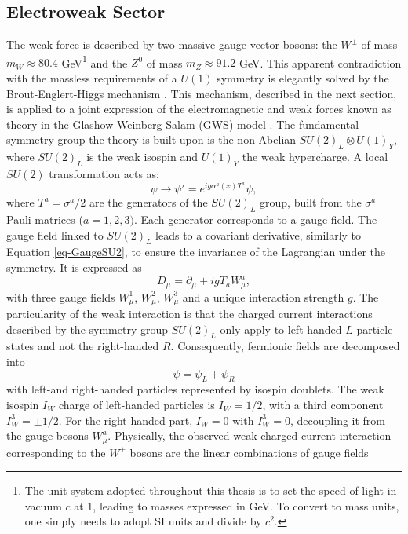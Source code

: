 \subsection{Electroweak Sector}
The weak force is described by two massive gauge vector bosons: the $W^{\pm}$ of mass $m_W \approx 80.4$ GeV\footnote{The unit system adopted throughout this thesis is to set the speed of light in vacuum $c$ at 1, leading to masses expressed in GeV. To convert to mass units, one simply needs to adopt SI units and divide by $c^2$.} and the $Z^0$ of mass $m_Z \approx 91.2$ GeV. This apparent contradiction with the massless requirements of a $U(1)$ symmetry is elegantly solved by the Brout-Englert-Higgs mechanism \cite{Englert:1964et,  PhysRevLett.13.508}. This mechanism, described in the next section, is applied to a joint expression of the electromagnetic and weak forces known as  theory in the Glashow-Weinberg-Salam (GWS) model \cite{GLASHOW1961579, PhysRevLett.19.1264, Salam:1968rm}. The fundamental symmetry group the theory is built upon is the non-Abelian $SU(2)_L \otimes U(1)_Y$, where $SU(2)_L$ is the weak isospin and $U(1)_Y$ the weak hypercharge. A local $SU(2)$ transformation acts as:
\begin{equation}\label{eq-GaugeSU2}
    \psi \rightarrow \psi' = e^{i g \alpha^a(x) T^a } \psi,
\end{equation}
where $T^a = \sigma^a / 2$ are the generators of the $SU(2)_L$ group, built from the $\sigma^a$ Pauli matrices ($a = 1, 2, 3)$. Each generator corresponds to a gauge field. The gauge field linked to $SU(2)_L$ leads to a covariant derivative, similarly to Equation \ref{eq-GaugeSU2}, to ensure the invariance of the Lagrangian under the symmetry. It is expressed as
\begin{equation}\label{eq-CovDerSU2}
   D_{\mu}  = \partial_{\mu} + igT_a W_{\mu}^a,
\end{equation}
with three gauge fields $W_{\mu}^1$, $W_{\mu}^2$, $W_{\mu}^3$ and a unique interaction strength $g$. The particularity of the weak interaction is that the charged current interactions described by the symmetry group $SU(2)_L$ only apply to left-handed $L$ particle states and not the right-handed $R$. Consequently, fermionic fields are decomposed into \[\psi = \psi_L + \psi_R\] with left-and right-handed particles represented by isospin doublets. The weak isospin $I_W$ charge of left-handed particles is $I_W = 1/2$, with a third component $I_W^3 = \pm  1/2$. For the right-handed part, $I_W = 0$ with $I_W^3 = 0$, decoupling it from the gauge bosons $W_{\mu}^a$. Physically, the observed weak charged current interaction corresponding to the $W^{\pm}$ bosons are the linear combinations of gauge fields
